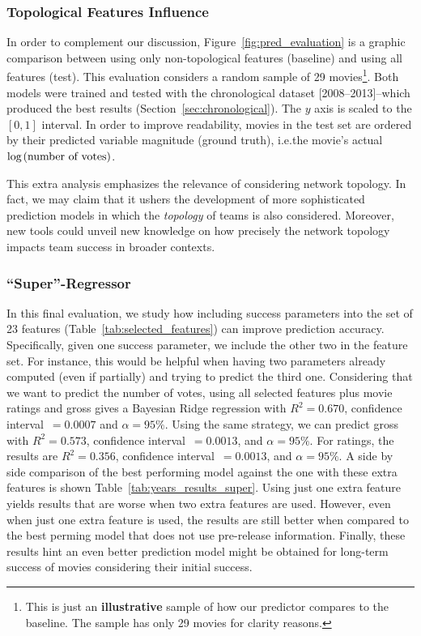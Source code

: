 \subsubsection{Topological Features Influence}
In order to complement our discussion, Figure~\ref{fig:pred_evaluation} is a
graphic comparison between using only non-topological features (baseline) and
using all features (test). This evaluation considers a random sample of 29
movies\footnote{This is just an \textbf{illustrative} sample of how our predictor
compares to the baseline. The sample has only 29 movies for clarity reasons.}.
Both models were trained and tested with the chronological dataset
[2008--2013]–which produced the best results (Section~\ref{sec:chronological}).
The $y$ axis is scaled to the $[0,1]$ interval. In order to improve
readability, movies in the test set are ordered by their predicted
variable magnitude (ground truth), i.e.\@ the movie's actual
\textit{$\log\kern\nulldelimiterspace(\textrm{number of votes})$}.

This extra analysis emphasizes the relevance of considering network topology. 
In fact, we may claim that it ushers the development of
more sophisticated prediction models in which the \textit{topology} of teams is
also considered. Moreover, new tools could unveil new knowledge on how precisely the
network topology impacts team success in broader contexts.

\subsubsection{``Super''-Regressor}
In this final evaluation, we study how including success parameters into the
set of 23 features (Table~\ref{tab:selected_features}) can improve prediction
accuracy.  Specifically, given one success parameter, we include the other two
in the feature set. For instance, this would be helpful when having two
parameters already computed (even if partially) and trying to predict the third
one.  Considering that we want to predict the number of votes, using all
selected features plus movie ratings and gross gives a Bayesian Ridge
regression with $R^2 = 0.670$, confidence interval~$= 0.0007$ and
$\alpha=95\%$. Using the same strategy, we can predict gross with $R^2 =
0.573$, confidence interval~$= 0.0013$, and $\alpha=95\%$. For ratings, the
results are $R^2 = 0.356$, confidence interval~$= 0.0013$, and $\alpha=95\%$. A
side by side comparison of the best performing model against the one with
these extra features is shown Table~\ref{tab:years_results_super}. Using just
one extra feature yields results that are worse when two extra features
are used. However, even when just one extra feature is used, the results are
still better when compared to the best perming model that does not use
pre-release information.  Finally, these results hint an even better prediction
model might be obtained for long-term success of movies considering their
initial success.

